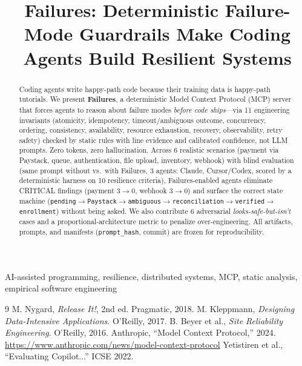 \documentclass[conference]{IEEEtran}
\title{Failures: Deterministic Failure-Mode Guardrails Make Coding Agents Build Resilient Systems}
\author{\IEEEauthorblockN{Mayowa Kalejaiye}
\IEEEauthorblockA{Failures MCP Project\\ \texttt{github.com/mayowa-kalejaiye/Failures}}}
\begin{document}
\maketitle

\begin{abstract}
Coding agents write happy-path code because their training data is happy-path tutorials. We present \textbf{Failures}, a deterministic Model Context Protocol (MCP) server that forces agents to reason about failure modes \emph{before code ships}---via 11 engineering invariants (atomicity, idempotency, timeout/ambiguous outcome, concurrency, ordering, consistency, availability, resource exhaustion, recovery, observability, retry safety) checked by static rules with line evidence and calibrated confidence, not LLM prompts. Zero tokens, zero hallucination. Across 6 realistic scenarios (payment via Paystack, queue, authentication, file upload, inventory, webhook) with blind evaluation (same prompt without vs.\ with Failures, 3 agents: Claude, Cursor/Codex, scored by a deterministic harness on 10 resilience criteria), Failures-enabled agents eliminate CRITICAL findings (payment 3$\to$0, webhook 3$\to$0) and surface the correct state machine (\texttt{pending$\to$Paystack$\to$ambiguous$\to$reconciliation$\to$verified$\to$enrollment}) without being asked. We also contribute 6 adversarial \emph{looks-safe-but-isn't} cases and a proportional-architecture metric to penalize over-engineering. All artifacts, prompts, and manifests (\texttt{prompt\_hash}, commit) are frozen for reproducibility.
\end{abstract}
\begin{IEEEkeywords}AI-assisted programming, resilience, distributed systems, MCP, static analysis, empirical software engineering\end{IEEEkeywords}











\begin{thebibliography}{9}
 M. Nygard, \emph{Release It!}, 2nd ed. Pragmatic, 2018.
 M. Kleppmann, \emph{Designing Data-Intensive Applications}. O'Reilly, 2017.
 B. Beyer et al., \emph{Site Reliability Engineering}. O'Reilly, 2016.
 Anthropic, ``Model Context Protocol,'' 2024. \url{https://www.anthropic.com/news/model-context-protocol}
 Yetistiren et al., ``Evaluating Copilot...'' ICSE 2022.
\end{thebibliography}
\end{document}
